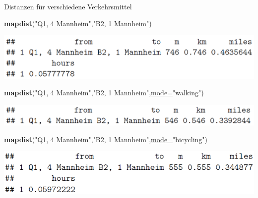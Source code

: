 \documentclass[ignorenonframetext,]{beamer}
\newenvironment{Shaded}{\begin{snugshade}}{\end{snugshade}}
\newcommand{\DataTypeTok}[1]{\textcolor[rgb]{0.74,0.68,0.62}{\underline{#1}}}
\newcommand{\KeywordTok}[1]{\textcolor[rgb]{0.26,0.66,0.93}{\textbf{#1}}}
\newcommand{\NormalTok}[1]{\textcolor[rgb]{0.74,0.68,0.62}{#1}}
\newcommand{\StringTok}[1]{\textcolor[rgb]{0.02,0.61,0.04}{#1}}
\begin{document}
\begin{frame}[fragile]{Distanzen für verschiedene Verkehrsmittel}
\protect\hypertarget{distanzen-fur-verschiedene-verkehrsmittel}{}

\begin{Shaded}
\begin{Highlighting}[]
\KeywordTok{mapdist}\NormalTok{(}\StringTok{"Q1, 4 Mannheim"}\NormalTok{,}\StringTok{"B2, 1 Mannheim"}\NormalTok{)}
\end{Highlighting}
\end{Shaded}

\includegraphics{figure/dist_car.PNG}

\begin{Shaded}
\begin{Highlighting}[]
\KeywordTok{mapdist}\NormalTok{(}\StringTok{"Q1, 4 Mannheim"}\NormalTok{,}\StringTok{"B2, 1 Mannheim"}\NormalTok{,}\DataTypeTok{mode=}\StringTok{"walking"}\NormalTok{)}
\end{Highlighting}
\end{Shaded}

\includegraphics{figure/dist_walking.PNG}

\begin{Shaded}
\begin{Highlighting}[]
\KeywordTok{mapdist}\NormalTok{(}\StringTok{"Q1, 4 Mannheim"}\NormalTok{,}\StringTok{"B2, 1 Mannheim"}\NormalTok{,}\DataTypeTok{mode=}\StringTok{"bicycling"}\NormalTok{)}
\end{Highlighting}
\end{Shaded}

\includegraphics{figure/dist_bike.PNG}

\end{frame}
\end{document}
